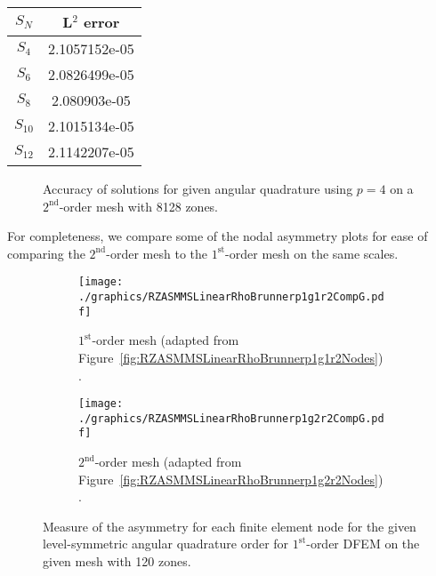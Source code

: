 \documentclass[12pt]{article}
\begin{document}
\begin{table}[!htb]
\centering
{\renewcommand{\arraystretch}{1.5}
\begin{tabular}{|c|c|}
\hline
$S_N$ & L$^2$ error \\\hline
$S_4$ & 2.1057152e-05 \\\hline
$S_6$ & 2.0826499e-05 \\\hline
$S_8$ & 2.080903e-05 \\\hline
$S_{10}$ & 2.1015134e-05 \\\hline
$S_{12}$ & 2.1142207e-05 \\\hline
\end{tabular}}
\end{table}

\begin{figure}[!htb]
\centering
{}
\caption{Accuracy of solutions for given angular quadrature using $p=4$ on a $2^\text{nd}$-order mesh with 8128 zones.}
\label{fig:RZASMMSLinearRhoBrunnerp4g2r5Accuracy}
\end{figure}

\FloatBarrier

For completeness, we compare some of the nodal asymmetry plots for ease of comparing the $2^\text{nd}$-order mesh to the $1^\text{st}$-order mesh on the same scales.

\begin{figure}[!htb]
\centering
\begin{subfigure}{0.48\textwidth}
\centering
\texttt{[image: ./graphics/RZASMMSLinearRhoBrunnerp1g1r2CompG.pdf]}
\caption{$1^\text{st}$-order mesh (adapted from Figure~\ref{fig:RZASMMSLinearRhoBrunnerp1g1r2Nodes}).}
\end{subfigure}%
\hspace{0.04\textwidth}%
\begin{subfigure}{0.48\textwidth}
\centering
\texttt{[image: ./graphics/RZASMMSLinearRhoBrunnerp1g2r2CompG.pdf]}
\caption{$2^\text{nd}$-order mesh (adapted from Figure~\ref{fig:RZASMMSLinearRhoBrunnerp1g2r2Nodes}).}
\end{subfigure}
\caption{Measure of the asymmetry for each finite element node for the given level-symmetric angular quadrature order for $1^\text{st}$-order DFEM on the given mesh with 120 zones.}
\end{figure}
\end{document}
